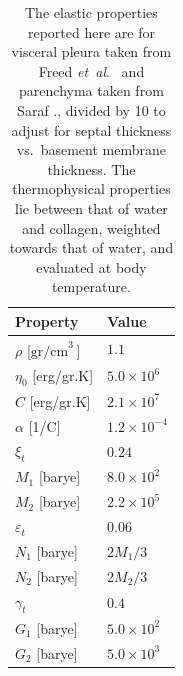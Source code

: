 \begin{table}
    \centering
    \begin{tabular}{|l|l|}
        \hline
        Property & Value \\ \hline
        $\rho$ \hfill [$\textrm{gr/cm}^{3^{\phantom{|}}}$] & $1.1$ \\
        $\eta_0$ \hfill [erg/gr.K] & $5.0 \times 10^6$ \\
        $C$ \hfill [erg/gr.K] & $2.1 \times 10^7$ \\
        $\alpha$ \hfill [1/C] & $1.2 \times 10^{-4}$ \\ \hline
        $\xi_t$ & $0.24$ \\
        $M_1$ \hfill [barye] & $8.0 \times 10^2$ \\
        $M_2$ \hfill [barye] & $2.2 \times 10^5$ \\ \hline
        $\varepsilon_t$ & $0.06$ \\
        $N_1$ \hfill [barye] & $2M_1/3$ \\
        $N_2$ \hfill [barye] & $2M_2/3$ \\ \hline
        $\gamma_t$ & $0.4$ \\
        $G_1$ \hfill [barye] & $5.0 \times 10^2$ \\
        $G_2$ \hfill [barye] & $5.0 \times 10^3$ \\ \hline
    \end{tabular}
    \caption{The elastic properties reported here are for visceral pleura taken from Freed \textit{et~al}.\ \cite{Freedetal17} and parenchyma taken from Saraf ., \cite{Sarafetal07} divided by 10 to adjust for septal thickness vs.\ basement membrane thickness.  The thermo\-physical properties lie between that of water and collagen, weighted towards that of water, and evaluated at body temperature.}
    \label{tableVisceralPleura}
\end{table}

